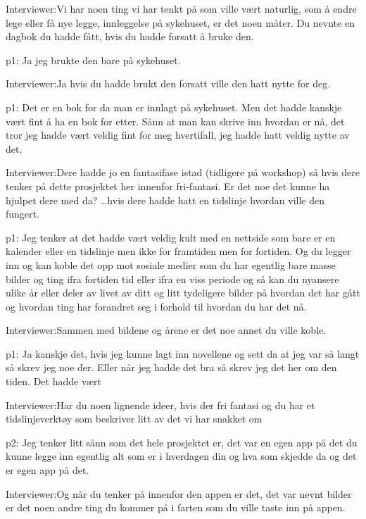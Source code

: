 \documentclass[../../MasterThesis.tex]{subfiles}
\begin{document}
\textcolor{myBlue} {Interviewer:}Vi har noen ting vi har tenkt på som ville vært naturlig, som å endre lege eller få nye legge, innleggelse på sykehuset, er det noen måter. Du nevnte en dagbok du hadde fått, hvis du hadde forsatt å bruke den.

\textcolor{myGreen} {p1:} Ja jeg brukte den bare på sykehuset.

\textcolor{myBlue} {Interviewer:}Ja hvis du hadde brukt den forsatt ville den hatt nytte for deg.

\textcolor{myGreen} {p1:} Det er en bok for da man er innlagt på sykehuset. Men det hadde kanskje vært fint å ha en bok for etter. Sånn at man kan skrive inn hvordan er nå, det tror jeg hadde vært veldig fint for meg hvertifall, jeg hadde hatt veldig nytte av det.

\textcolor{myBlue} {Interviewer:}Dere hadde jo en fantasifase istad (tidligere på workshop) så hvis dere tenker på dette prosjektet her innenfor fri-fantasi. Er det noe det kunne ha hjulpet dere med da? \dots hvis dere hadde hatt en tidslinje hvordan ville den fungert.

\textcolor{myGreen} {p1:} Jeg tenker at det hadde vært veldig kult med en nettside som bare er en kalender eller en tidslinje men ikke for framtiden men for fortiden. Og du legger inn og kan koble det opp mot sosiale medier som du har egentlig bare masse bilder og ting ifra fortiden tid eller ifra en viss periode og så kan du nyansere ulike år eller deler av livet av ditt og litt tydeligere bilder på hvordan det har gått og hvordan ting har forandret seg i forhold til hvordan du har det nå.

\textcolor{myBlue} {Interviewer:}Sammen med bildene og årene er det noe annet du ville koble. 

\textcolor{myGreen} {p1:} Ja kanskje det, hvis jeg kunne lagt inn novellene og sett da at jeg var så langt så skrev jeg noe der. Eller når jeg hadde det bra så skrev jeg det her om den tiden. Det hadde vært

\textcolor{myBlue} {Interviewer:}Har du noen lignende ideer, hvis der fri fantasi og du har et tidslinjeverktøy som beskriver litt av det vi har snakket om

\textcolor{myYellow} {p2:} Jeg tenker litt sånn som det hele prosjektet er, det var en egen app på det du kunne legge inn egentlig alt som er i hverdagen din og hva som skjedde da og det er egen app på det. 

\textcolor{myBlue} {Interviewer:}Og når du tenker på innenfor den appen er det, det var nevnt bilder er det noen andre ting du kommer på i farten som du ville taste inn på appen.
\end{document}
